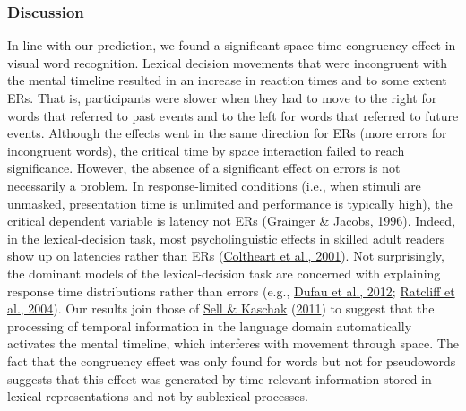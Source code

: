 \documentclass[
  a4paper,12pt,twoside,onecolumn,openright,final,oldfontcommands]{memoir}
\begin{document}
\hypertarget{discussion}{%
\subsubsection{Discussion}\label{discussion}}

In line with our prediction, we found a significant space-time congruency effect in visual word recognition. Lexical decision movements that were incongruent with the mental timeline resulted in an increase in reaction times and to some extent ERs. That is, participants were slower when they had to move to the right for words that referred to past events and to the left for words that referred to future events. Although the effects went in the same direction for ERs (more errors for incongruent words), the critical time by space interaction failed to reach significance. However, the absence of a significant effect on errors is not necessarily a problem. In response-limited conditions (i.e., when stimuli are unmasked, presentation time is unlimited and performance is typically high), the critical dependent variable is latency not ERs (\protect\hyperlink{ref-grainger_orthographic_1996}{Grainger \& Jacobs, 1996}). Indeed, in the lexical-decision task, most psycholinguistic effects in skilled adult readers show up on latencies rather than ERs (\protect\hyperlink{ref-coltheart_drc_2001}{Coltheart et al., 2001}). Not surprisingly, the dominant models of the lexical-decision task are concerned with explaining response time distributions rather than errors (e.g., \protect\hyperlink{ref-dufau_how_2012}{Dufau et al., 2012}; \protect\hyperlink{ref-ratcliff_diffusion_2004}{Ratcliff et al., 2004}).
Our results join those of \protect\hyperlink{ref-sell_processing_2011}{Sell \& Kaschak} (\protect\hyperlink{ref-sell_processing_2011}{2011}) to suggest that the processing of temporal information in the language domain automatically activates the mental timeline, which interferes with movement through space. The fact that the congruency effect was only found for words but not for pseudowords suggests that this effect was generated by time-relevant information stored in lexical representations and not by sublexical processes.
\end{document}
